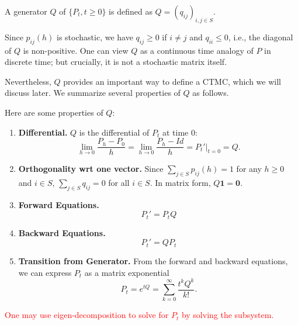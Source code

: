 \documentclass[11pt,twoside]{article}
\begin{document}
\begin{definition}[Generator]
    A generator $Q$ of $\{P_t, t \geq 0\}$ is defined as $Q = (q_{ij})_{i, j \in S}$.
\end{definition}

Since $p_{ij}(h)$ is stochastic, we have $q_{ij} \geq 0$ if $i \neq j$ and $q_{ii} \leq 0$, i.e., the diagonal of $Q$ is non-positive. One can view $Q$ as a continuous time analogy of $P$ in discrete time; but crucially, it is not a stochastic matrix itself. 

Nevertheless, $Q$ provides an important way to define a CTMC, which we will discuss later. We summarize several properties of $Q$ as follows.

\begin{theorem} Here are some properties of $Q$:
    \begin{enumerate}
        \item \textbf{Differential.} $Q$ is the differential of $P_t$ at time $0$:
        \[
        \lim_{h \to 0}\frac{P_h-P_0}{h} = \lim_{h \to 0}\frac{P_h-Id}{h} = P_t'|_{t=0} = Q.
        \]
        \item \textbf{Orthogonality wrt one vector.} Since $\sum_{j \in S} p_{ij}(h) = 1$ for any $h \geq 0$ and $i \in S$, $\sum_{j \in S} q_{ij}=0$ for all $i \in S$. In matrix form, $Q\boldsymbol{1} = \boldsymbol{0}$.
        \item \textbf{Forward Equations.} 
        \[
        P_t'=P_tQ
        \]
        \item \textbf{Backward Equations.} 
        \[
        P_t'=QP_t
        \]
        \item \textbf{Transition from Generator.}
        From the forward and backward equations, we can express $P_t$ as a matrix exponential
        \[
        P_t = e^{tQ} = \sum_{k=0}^\infty \frac{t^kQ^k}{k!}.
        \]
    \end{enumerate}
    \textcolor{red}{One may use eigen-decomposition to solve for $P_t$ by solving the subsystem.}
\end{theorem}
\end{document}
